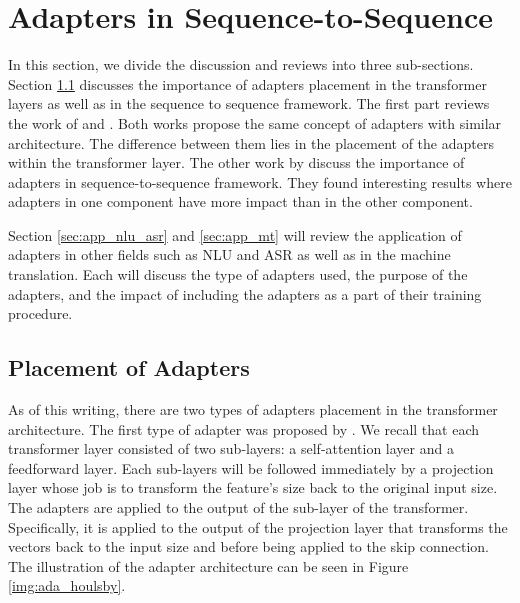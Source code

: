\section{Adapters in Sequence-to-Sequence}
\label{sec:adapter_seq}

In this section, we divide the discussion and reviews into three sub-sections. Section \ref{sec:adapter_place} discusses the importance of adapters placement in the transformer layers as well as in the sequence to sequence framework. The first part reviews the work of \cite{houlsby2019parameter} and \cite{bapna2019simple}. Both works propose the same concept of adapters with similar architecture. The difference between them lies in the placement of the adapters within the transformer layer. The other work by \cite{winata2020adapt} discuss the importance of adapters in sequence-to-sequence framework. They found interesting results where adapters in one component have more impact than in the other component.

Section \ref{sec:app_nlu_asr} and \ref{sec:app_mt} will review the application of adapters in other fields such as NLU and ASR as well as in the machine translation. Each will discuss the type of adapters used, the purpose of the adapters, and the impact of including the adapters as a part of their training procedure.

\subsection{Placement of Adapters}
\label{sec:adapter_place}
As of this writing, there are two types of adapters placement in the transformer architecture. The first type of adapter was proposed by \cite{houlsby2019parameter}. We recall that each transformer layer consisted of two sub-layers: a self-attention layer and a feedforward layer. Each sub-layers will be followed immediately by a projection layer whose job is to transform the feature's size back to the original input size. The adapters are applied to the output of the sub-layer of the transformer. Specifically, it is applied to the output of the projection layer that transforms the vectors back to the input size and before being applied to the skip connection. The illustration of the adapter architecture can be seen in Figure \ref{img:ada_houlsby}.

